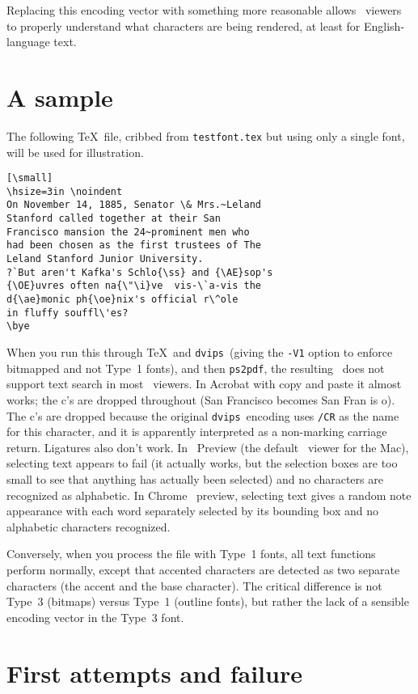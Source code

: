 \documentclass[final]{ltugboat}
\def\PDF{\acro{PDF}}
\def\dvips{\texttt{dvips}}
\def\ps2pdf{\texttt{ps2pdf}}
\begin{document}
Replacing this encoding vector with something more
reasonable allows \PDF\ viewers to properly understand what
characters are being rendered, at least for English-language text.

\section{A sample}

The following \TeX\ file, cribbed from \texttt{testfont.tex}
but using only a single font, will be used for illustration.

\begin{verbatim}[\small]
\hsize=3in \noindent
On November 14, 1885, Senator \& Mrs.~Leland
Stanford called together at their San
Francisco mansion the 24~prominent men who
had been chosen as the first trustees of The
Leland Stanford Junior University.
?`But aren't Kafka's Schlo{\ss} and {\AE}sop's
{\OE}uvres often na{\"\i}ve  vis-\`a-vis the
d{\ae}monic ph{\oe}nix's official r\^ole
in fluffy souffl\'es?
\bye
\end{verbatim}
\noindent
When you run this through \TeX\ and \dvips\
(giving the \texttt{-V1} option to enforce bitmapped
and not Type~1 fonts), and then \ps2pdf,
the resulting \PDF\ does not
support text search in most \PDF\ viewers.  In Acrobat
with copy and paste it almost works;
the c's are dropped throughout (San Francisco becomes
San Fran is o).  The c's are dropped because the
original \dvips\ encoding uses \texttt{/CR} as the
name for this character, and it is apparently
interpreted as a non-marking carriage return.
Ligatures also don't work.  In \MacOSX\
Preview (the default \PDF\ viewer for the Mac),
selecting text appears to fail (it
actually works, but the selection boxes are too small
to see that anything has actually been selected) and
no characters are recognized as alphabetic.  In Chrome
\PDF\ preview, selecting text gives a random note
appearance with each word separately selected by its
bounding box and no alphabetic characters recognized.

Conversely, when you process the file with Type~1
fonts, all text functions perform normally, except that
accented characters are detected as two separate
characters (the accent and the base character).  The
critical difference is not Type~3 (bitmaps) versus
Type~1 (outline fonts), but rather the lack of a
sensible encoding vector in the Type~3 font.

\section{First attempts and failure}
\end{document}
